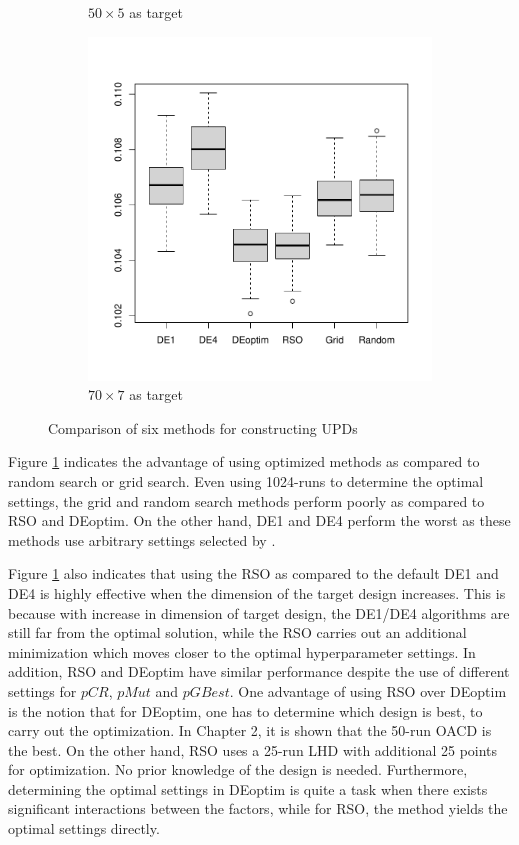 \documentclass [PhD] {package/uclathes}
\begin{document}
\begin{figure}
\begin{subfigure}[b]{0.3\textwidth}
         \caption{$50\times 5$ as target}
     \end{subfigure}
     \hfill
     \begin{subfigure}[b]{0.3\textwidth}
         \centering
         \includegraphics[width=\textwidth]{chapters/RSO/pdfs/boxplots4}
         \caption{$70\times 7$ as target}
     \end{subfigure}
        \caption{Comparison of six methods for constructing UPDs}
        \label{fig:6methods}
\end{figure}

Figure \ref{fig:6methods} indicates the advantage of using optimized methods as compared to random search or grid search. Even using 1024-runs to determine the optimal settings, the grid and random search methods perform poorly as compared to RSO and DEoptim. On the other hand, DE1 and DE4 perform the worst as these methods use arbitrary settings selected by \textcite{stokes2023metaheuristic}.

Figure \ref{fig:6methods} also indicates that using the RSO as compared to the default DE1 and DE4 is highly effective when the dimension of the target design increases. This is because with increase in dimension of target design, the DE1/DE4 algorithms are still far from the optimal solution, while the RSO carries out an additional minimization which moves closer to the optimal hyperparameter settings. In addition, RSO and DEoptim have similar performance despite the use of different settings for $pCR$, $pMut$ and $pGBest$. One advantage of using RSO over DEoptim is the notion that for DEoptim, one has to determine which design is best, to carry out the optimization. In Chapter 2, it is shown that the 50-run OACD is the best. On the other hand, RSO uses a 25-run LHD with additional 25 points for optimization. No prior knowledge of the design is needed. Furthermore, determining the optimal settings in DEoptim is quite a task when there exists significant interactions between the factors, while for RSO, the method yields the optimal settings directly.
\end{document}
